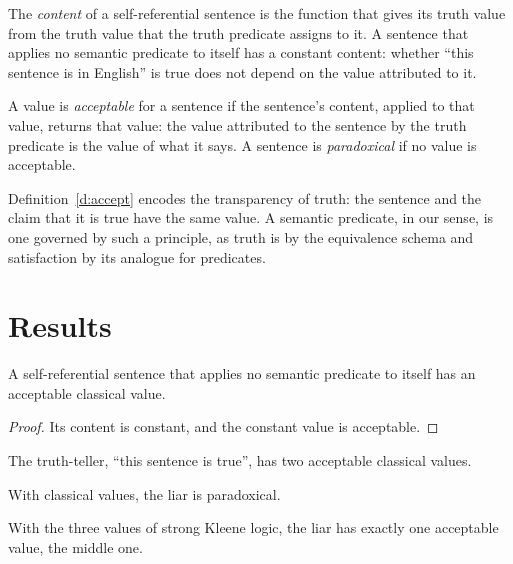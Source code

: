 \documentclass{situationist-preprint}
\begin{document}
\begin{definition}\label{d:content}
The \emph{content} of a self-referential sentence is the function that gives its truth value from the truth value that the truth predicate assigns to it. A sentence that applies no semantic predicate to itself has a constant content: whether \enquote{this sentence is in English} is true does not depend on the value attributed to it.
\end{definition}

\begin{definition}\label{d:accept}
A value is \emph{acceptable} for a sentence if the sentence's content, applied to that value, returns that value: the value attributed to the sentence by the truth predicate is the value of what it says. A sentence is \emph{paradoxical} if no value is acceptable.
\end{definition}

Definition~\ref{d:accept} encodes the transparency of truth: the sentence and the claim that it is true have the same value. A semantic predicate, in our sense, is one governed by such a principle, as truth is by the equivalence schema and satisfaction by its analogue for predicates.

\section{Results}

\begin{proposition}\label{p:harmless}
A self-referential sentence that applies no semantic predicate to itself has an acceptable classical value.
\end{proposition}

\begin{proof}
Its content is constant, and the constant value is acceptable.
\end{proof}

\begin{proposition}\label{p:teller}
The truth-teller, \enquote{this sentence is true}, has two acceptable classical values.
\end{proposition}

\begin{proposition}\label{p:liar}
With classical values, the liar is paradoxical.
\end{proposition}

\begin{proposition}\label{p:kleene}
With the three values of strong Kleene logic, the liar has exactly one acceptable value, the middle one.
\end{proposition}
\end{document}
